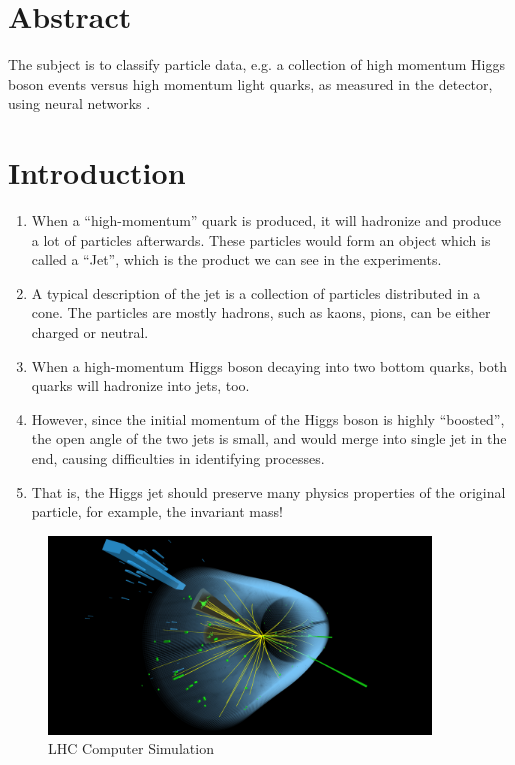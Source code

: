 \documentclass[a4paper,12pt, oneside]{article}
\begin{document}
\section{Abstract}
The subject is to classify particle data, e.g. a collection of high momentum Higgs boson \cite{PhysRevLett.13.508} events versus high momentum light quarks, as measured in the detector, using neural networks \cite{Giannini:2730094}.

\section{Introduction}
\begin{enumerate} [label = \Roman*.]
	\item When a ``high-momentum'' quark is produced, it will hadronize and produce a lot of particles afterwards. These particles would form an object which is called a ``Jet'', which is the product we can see in the experiments.
	\item A typical description of the jet is a collection of particles distributed in a cone. The particles are mostly hadrons, such as kaons, pions, can be either charged or neutral.
	\item When a high-momentum Higgs boson decaying into two bottom quarks, both quarks will hadronize into jets, too.
	\item However, since the initial momentum of the Higgs boson is highly ``boosted'', the open angle of the two jets is small, and would merge into single jet in the end, causing difficulties in identifying processes.
	\item That is, the Higgs jet should preserve many physics properties of the original particle, for example, the invariant mass!
\end{enumerate}
%
\begin{figure}[H]
\centering
\includegraphics[width = 4in]{LHC_Sim.png}
\caption{LHC Computer Simulation}\label{LHC_Computer_Simulation}
\end{figure}
\end{document}
